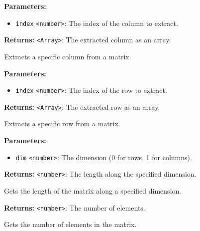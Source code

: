 \documentclass[12pt,a4paper]{article}
\begin{document}
\noindent \textbf{Parameters:}
\begin{itemize}
  \item \texttt{index} \texttt{<number>}: The index of the column to extract.
\end{itemize}

\noindent \textbf{Returns:} \texttt{<Array>}: The extracted column as an array.

\noindent Extracts a specific column from a matrix.

\vspace{5mm}
\noindent {}


\noindent \textbf{Parameters:}
\begin{itemize}
  \item \texttt{index} \texttt{<number>}: The index of the row to extract.
\end{itemize}

\noindent \textbf{Returns:} \texttt{<Array>}: The extracted row as an array.

\noindent Extracts a specific row from a matrix.

\vspace{5mm}
\noindent {}


\noindent \textbf{Parameters:}
\begin{itemize}
  \item \texttt{dim} \texttt{<number>}: The dimension (0 for rows, 1 for columns).
\end{itemize}

\noindent \textbf{Returns:} \texttt{<number>}: The length along the specified dimension.

\noindent Gets the length of the matrix along a specified dimension.

\vspace{5mm}
\noindent {}


\noindent \textbf{Returns:} \texttt{<number>}: The number of elements.

\noindent Gets the number of elements in the matrix.

\vspace{5mm}
\noindent {}
\end{document}
